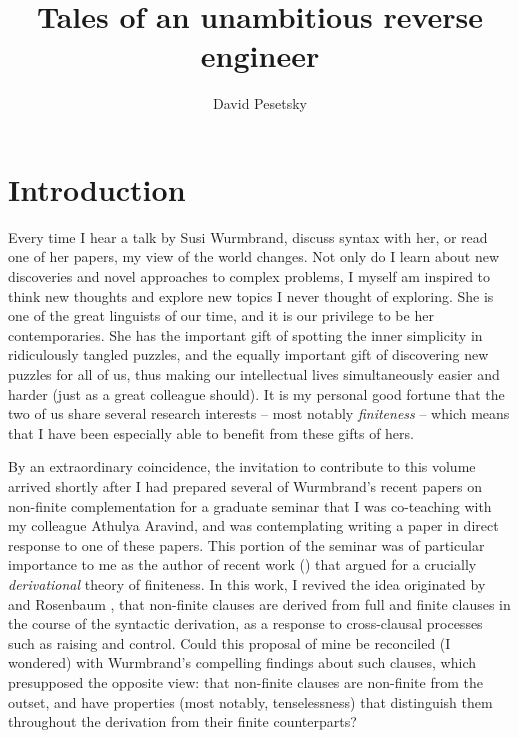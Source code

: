 \documentclass[output=paper]{langscibook}
\author{David Pesetsky\orcid{0000-0003-1530-9230}\affiliation{Massachusetts Institute of Technology}}
\title{Tales of an unambitious reverse engineer}
\begin{document}
\maketitle

\section{Introduction}

Every time I hear a talk by Susi Wurmbrand, discuss syntax with her, or read one of her papers, my view of the world changes. Not only do I learn about new discoveries and novel approaches to complex problems, I myself am inspired to think new thoughts and explore new topics I never thought of exploring. She is one of the great linguists of our time, and it is our privilege to be her contemporaries. She has the important gift of spotting the inner simplicity in ridiculously tangled puzzles, and the equally important gift of discovering new puzzles for all of us, thus making our intellectual lives simultaneously easier and harder (just as a great colleague should). It is my personal good fortune that the two of us share several research interests -- most notably \textit{finiteness} -- which means that I have been especially able to benefit from these gifts of hers.

By an extraordinary coincidence, the invitation to contribute to this volume arrived shortly after I had prepared several of Wurmbrand's recent papers on non-finite complementation for a graduate seminar that I was co-teaching with my colleague Athulya Aravind, and was contemplating writing a paper in direct response to one of these papers. This portion of the seminar was of particular importance to me as the author of recent work (\citealt{Pesetsky:2019aa}) that argued for a crucially \textit{derivational} theory of finiteness. In this work, I revived the idea originated by \citet{Lees1963} and Rosenbaum \citeyearpar{Rosenbaum:1965aa,Rosenbaum1967}, that non-finite clauses are derived from full and finite clauses in the course of the syntactic derivation, as a response to cross-clausal processes such as raising and control. Could this proposal of mine be reconciled (I wondered) with Wurmbrand's compelling findings about such clauses, which presupposed the opposite view: that non-finite clauses are non-finite from the outset, and have properties (most notably, tenselessness) that distinguish them throughout the derivation from their finite counterparts? 
\end{document}
